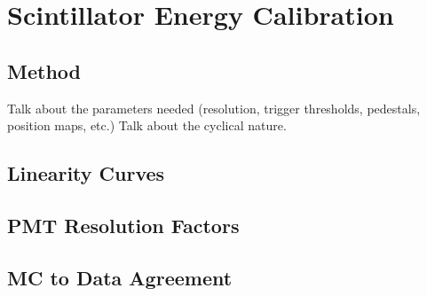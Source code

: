 
\section{Scintillator Energy Calibration}

\subsection{Method}
Talk about the parameters needed (resolution, trigger thresholds, pedestals, position maps, etc.)
Talk about the cyclical nature.
\subsection{Linearity Curves}
\subsection{PMT Resolution Factors} \label{ssec:PMTresolution}
\subsection{MC to Data Agreement}








